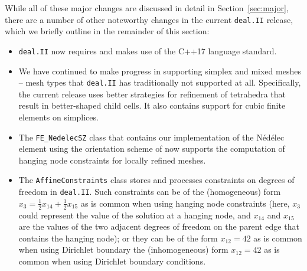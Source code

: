 \documentclass{ansarticle-preprint}
\newcommand{\specialword}[1]{\texttt{#1}}
\newcommand{\dealii}{{\specialword{deal.II}}\xspace}
\begin{document}
While all of these major changes are discussed in detail in
Section~\ref{sec:major}, there
are a number of other noteworthy changes in the current \dealii release,
which we briefly outline in the remainder of this section:
%
\begin{itemize}
  \item \dealii{} now requires and makes use of the C++17 language standard.
  \item We have continued to make progress in supporting simplex and
    mixed meshes -- mesh types that \dealii{} has traditionally not
    supported at all. Specifically, the current release uses
    better strategies for refinement of tetrahedra that result in
    better-shaped child cells. It also contains
    support for cubic finite elements on simplices.
  \item The \texttt{FE\_NedelecSZ} class that contains our
    implementation of the N\'ed\'elec element using the orientation
    scheme of \cite{Zag06} now supports the computation of hanging
    node constraints for locally refined meshes.
  \item The \texttt{AffineConstraints} class stores and processes
    constraints on degrees of freedom in \dealii{}. Such constraints
    can be of the (homogeneous) form $x_3 = \frac 12 x_{14} + \frac 12 x_{15}$ as is
    common when using hanging node constraints (here, $x_3$ could
    represent the value of the solution at a hanging node, and $x_{14}$
    and $x_{15}$ are the values of the two adjacent degrees of freedom on
    the parent edge that contains the hanging node); or they can be of
    the form $x_{12}=42$ as is common when using Dirichlet boundary
    the (inhomogeneous) form $x_{12}=42$ as is common when using Dirichlet boundary
    conditions.


\end{itemize}
\end{document}
